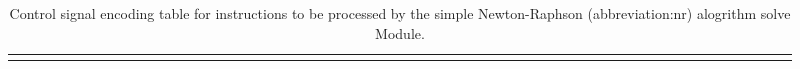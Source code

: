 \documentclass[./../../text.tex]{subfiles}
\begin{document}
\begin{table}[htbp!]
                \centering
                \caption{Control signal encoding table for instructions to be processed by the simple Newton-Raphson (\gls{abbreviation:nr}) alogrithm solve Module.}
                \vspace*{0.15cm}
                \resizebox{\textwidth}{!}
                    {
\begin{tabular}{!{\vrule width 2pt}c!{\vrule width 2pt}l!{\vrule width 2pt}c!{\vrule width 2pt}cccc!{\vrule width 2pt}cccc!{\vrule width 2pt}cccc!{\vrule width 2pt}cccc!{\vrule width 2pt}cccc!{\vrule width 2pt}cccc!{\vrule width 2pt}cccc!{\vrule width 2pt}cccc!{\vrule width 2pt}cccc!{\vrule width 2pt}cccc!{\vrule width 2pt}cccc!{\vrule width 2pt}cccc!{\vrule width 2pt}cccc!{\vrule width 2pt}c!{\vrule width 2pt}}

\end{tabular}}
\end{table}
\end{document}
